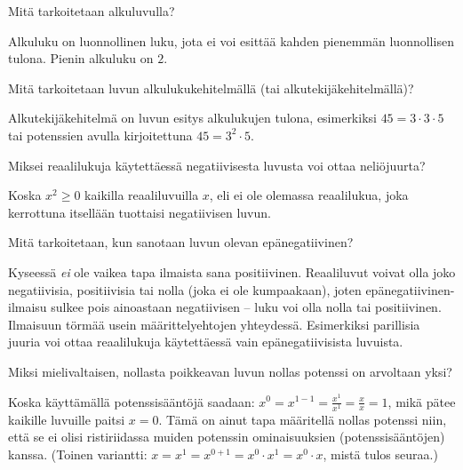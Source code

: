 \begin{multicols}{2}
\begin{tehtava}
Mitä tarkoitetaan alkuluvulla?
\begin{vastaus}
Alkuluku on luonnollinen luku, jota ei voi esittää kahden pienemmän luonnollisen tulona. Pienin alkuluku on $2$. %
\end{vastaus}
\end{tehtava}

\begin{tehtava}
Mitä tarkoitetaan luvun alkulukukehitelmällä (tai alkutekijäkehitelmällä)?
\begin{vastaus}
Alkutekijäkehitelmä on luvun esitys alkulukujen tulona, esimerkiksi $45=3\cdot 3 \cdot 5$ tai potenssien avulla kirjoitettuna $45=3^2\cdot 5$.
\end{vastaus}
\end{tehtava}

\begin{tehtava}
Miksei reaalilukuja käytettäessä negatiivisesta luvusta voi ottaa neliöjuurta?
\begin{vastaus}
Koska $x^2 \geq 0$ kaikilla reaaliluvuilla $x$, eli ei ole olemassa reaalilukua, joka kerrottuna itsellään tuottaisi negatiivisen luvun.
\end{vastaus}
\end{tehtava}

\begin{tehtava}
Mitä tarkoitetaan, kun sanotaan luvun olevan epänegatiivinen?
\begin{vastaus}
Kyseessä \textit{ei} ole vaikea tapa ilmaista sana positiivinen. Reaaliluvut voivat olla joko negatiivisia, positiivisia tai nolla (joka ei ole kumpaakaan), joten epänegatiivinen-ilmaisu sulkee pois ainoastaan negatiivisen -- luku voi olla nolla tai positiivinen. Ilmaisuun törmää usein määrittelyehtojen yhteydessä. Esimerkiksi parillisia juuria voi ottaa reaalilukuja käytettäessä vain epänegatiivisista luvuista.
\end{vastaus}
\end{tehtava}

\begin{tehtava}
Miksi mielivaltaisen, nollasta poikkeavan luvun nollas potenssi on arvoltaan yksi?
\begin{vastaus}
Koska käyttämällä potenssisääntöjä saadaan: $x^0=x^{1-1}=\frac{x^1}{x^1}=\frac{x}{x}=1$, mikä pätee kaikille luvuille paitsi $x=0$. Tämä on ainut tapa määritellä nollas potenssi niin, että se ei olisi ristiriidassa muiden potenssin ominaisuuksien (potenssisääntöjen) kanssa. (Toinen variantti: $x=x^1=x^{0+1}=x^0 \cdot x^1 = x^0 \cdot x$, mistä tulos seuraa.)
\end{vastaus}
\end{tehtava}


\end{multicols}
